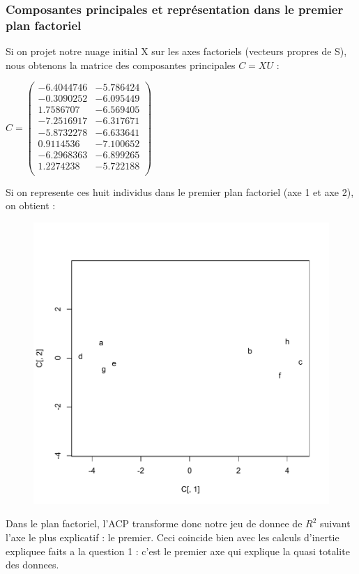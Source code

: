 \documentclass[a4paper,11pt]{article}
\begin{document}
\subsubsection{Composantes principales et représentation dans le premier plan factoriel}

\noindent Si on projet notre nuage initial X sur les axes factoriels (vecteurs propres de S), nous obtenons la matrice des composantes principales $C = XU$ :
\begin{center}
$ C =  \begin{pmatrix}
-6.4044746&-5.786424\\
-0.3090252&-6.095449\\
1.7586707&-6.569405\\
-7.2516917&-6.317671\\
-5.8732278&-6.633641\\
0.9114536&-7.100652\\
-6.2968363&-6.899265\\
1.2274238&-5.722188\\
\end{pmatrix}$
\end{center}
\noindent Si on represente ces huit individus dans le premier plan factoriel (axe 1 et axe 2), on obtient :
\begin{figure}[H]
\begin{center}
\includegraphics[width=.6\textwidth]{Exo1/ACP.pdf}
\end{center}
\end{figure}
\noindent Dans le plan factoriel, l'ACP transforme donc notre jeu de donnee de $R^2$ suivant l'axe le plus explicatif : le premier. Ceci coincide bien avec les calculs d'inertie expliquee faits a la question 1 : c'est le premier axe qui explique la quasi totalite des donnees.\\
\end{document}
